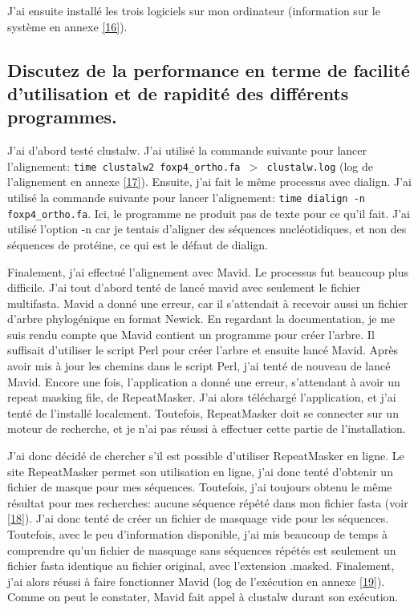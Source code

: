 \documentclass[11pt]{article} %
\begin{document}
J'ai ensuite installé les trois logiciels sur mon ordinateur (information sur le système en annexe \ref{16}).

\subsection[Facilité et rapidité des programmes]{Discutez de la performance en terme de facilité d'utilisation
et de rapidité des différents programmes.}

J'ai d'abord testé clustalw. J'ai utilisé la commande suivante pour lancer l'alignement: 
\texttt{time clustalw2 foxp4\_ortho.fa $>$ clustalw.log} (log de l'alignement en annexe \ref{17}). Ensuite,
j'ai fait le même processus avec dialign. J'ai utilisé la commande suivante pour lancer l'alignement:
\texttt{time dialign -n foxp4\_ortho.fa}. Ici, le programme ne produit pas de texte pour ce qu'il fait. J'ai
utilisé l'option -n car je tentais d'aligner des séquences nucléotidiques, et non des séquences de protéine,
ce qui est le défaut de dialign.

Finalement, j'ai effectué l'alignement avec Mavid. Le processus fut beaucoup plus difficile. J'ai tout d'abord
tenté de lancé mavid avec seulement le fichier multifasta. Mavid a donné une erreur, car il s'attendait à
recevoir aussi un fichier d'arbre phylogénique en format Newick. En regardant la documentation, je me
suis rendu compte que Mavid contient un programme pour créer l'arbre. Il suffisait d'utiliser le script
Perl pour créer l'arbre et ensuite lancé Mavid. Après avoir mis à jour les chemins dans le script Perl,
j'ai tenté de nouveau de lancé Mavid. Encore une fois, l'application a donné une erreur, s'attendant à
avoir un repeat masking file, de RepeatMasker. J'ai alors téléchargé l'application, et j'ai tenté de
l'installé localement. Toutefois, RepeatMasker doit se connecter sur un moteur de recherche, et je n'ai
pas réussi à effectuer cette partie de l'installation.

J'ai donc décidé de chercher s'il est possible d'utiliser RepeatMasker en ligne. Le site RepeatMasker permet
son utilisation en ligne, j'ai donc tenté d'obtenir un fichier de masque pour mes séquences. Toutefois, j'ai
toujours obtenu le même résultat pour mes recherches: aucune séquence répété dans mon fichier fasta (voir \ref{18}).
J'ai donc tenté de créer un fichier de masquage vide pour les séquences. Toutefois, avec le peu d'information disponible,
j'ai mis beaucoup de temps à comprendre qu'un fichier de masquage sans séquences répétés est seulement un fichier
fasta identique au fichier original, avec l'extension .masked. Finalement, j'ai alors réussi à faire fonctionner
Mavid (log de l'exécution en annexe \ref{19}). Comme on peut le constater, Mavid fait appel à clustalw durant son
exécution.
\end{document}
